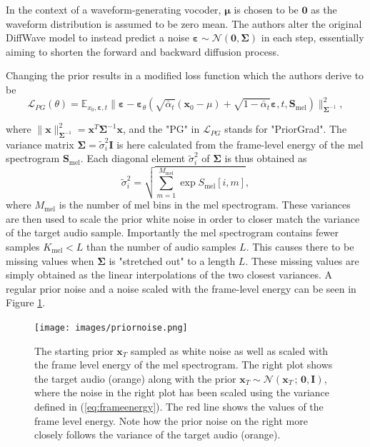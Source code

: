 \documentclass{report}
\begin{document}
In the context of a waveform-generating vocoder, $\bm{\mu}$ is chosen to be $\bm{0}$ as the waveform distribution is assumed to be zero mean. The authors alter the original DiffWave model to instead predict a noise $\bm{\varepsilon} \sim \mathcal{N}(\bm{0}, \bm{\Sigma})$ in each step, essentially aiming to shorten the forward and backward diffusion process.

Changing the prior results in a modified loss function which the authors derive to be
\begin{equation} \label{eq:priorloss}
    \mathcal{L}_{PG}(\theta) = \mathbb{E}_{x_0, \bm{\varepsilon}, t} \|\bm{\varepsilon} - \bm{\varepsilon}_{\theta}(\sqrt{\bar{\alpha}_t} (\textbf{x}_0-\mu) + \sqrt{1 - \bar{\alpha}_t} \bm{\varepsilon}, t, \bm{S}_{\text{mel}}) \|^2_{\bm{\Sigma}^{-1}},
\end{equation}

where $\|\bm{x} \|^2_{\bm{\Sigma}^{-1}} = \bm{x}^T \bm{\Sigma}^{-1} \bm{x}$, and the "PG" in $\mathcal{L}_{PG}$ stands for "PriorGrad". The variance matrix $\bm{\Sigma} = \tilde{\sigma}_i^2 \bm{I}$ is here calculated from the frame-level energy of the mel spectrogram $\bm{S}_{\text{mel}}$. Each diagonal element $\tilde{\sigma}_i^2$ of $\bm{\Sigma}$ is thus obtained as
\begin{equation} \label{eq:frameenergy}
    \tilde{\sigma}_i^2 = \sqrt{\sum_{m=1}^{M_{\text{mel}}} \exp{S_{\text{mel}}[i, m]}},
\end{equation}
where $M_{\text{mel}}$ is the number of mel bins in the mel spectrogram. These variances are then used to scale the prior white noise in order to closer match the variance of the target audio sample. Importantly the mel spectrogram contains fewer samples $K_{\text{mel}} < L$ than the number of audio samples $L$. This causes there to be missing values when $\bm{\Sigma}$ is "stretched out" to a length $L$. These missing values are simply obtained as the linear interpolations of the two closest variances. A regular prior noise and a noise scaled with the frame-level energy can be seen in Figure \ref{fig:priornoise}.
\begin{figure}[H]
    \centering
    \texttt{[image: images/priornoise.png]}
    \caption{\onehalfspacing The starting prior $\bm{x}_T$ sampled as white noise as well as scaled with the frame level energy of the mel spectrogram. The right plot shows the target audio (orange) along with the prior $\bm{x}_T \sim \mathcal{N}(\bm{x}_T \, ; \, \bm{0}, \bm{I})$, where the noise in the right plot has been scaled using the variance defined in (\ref{eq:frameenergy}). The red line shows the values of the frame level energy. Note how the prior noise on the right more closely follows the variance of the target audio (orange).}
    \label{fig:priornoise}
\end{figure}
\end{document}
